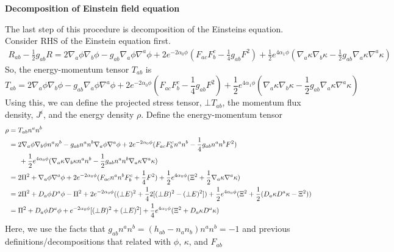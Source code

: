 \documentclass[prd]{revtex4}
\begin{document}
\textbf{Decomposition of Einstein field equation}


The last step of this procedure is decomposition of the Einstein\textsc{}s equation. Consider RHS of the Einstein equation first.
\begin{align}
R_{ab} -\frac{1}{2} g_{ab} R = 2 \nabla_a \phi \nabla_b \phi - g_{ab} \nabla_a \phi \nabla^a \phi + 2 e^{-2 \alpha_0 \phi} ( F_{ac} F_b^c -\frac{1}{4} g_{ab} F^2) + \frac{1}{2} e^{4 \alpha_1 \phi} (\nabla_a \kappa \nabla_b \kappa -\frac{1}{2} g_{ab} \nabla_a \kappa \nabla^a \kappa) 
\end{align}
So, the energy-momentum tensor $T_{ab}$ is
\begin{equation}
T_{ab} = 2 \nabla_a \phi \nabla_b \phi - g_{ab} \nabla_a \phi \nabla^a \phi + 2 e^{-2 \alpha_0 \phi} ( F_{ac} F_b^c -\frac{1}{4} g_{ab} F^2) +\frac{1}{2} e^{4 \alpha_1 \phi} (\nabla_a \kappa \nabla_b \kappa -\frac{1}{2} g_{ab} \nabla_a \kappa \nabla^a \kappa)
\end{equation}
Using this, we can define the projected stress tensor, $\bot T_{ab}$, the momentum flux density, $J^i$, and the energy density $\rho$. Define the energy-momentum tensor
\begin{align}
\rho &= T_{ab} n^a n^b \nonumber \\
       &= 2 \nabla_a \phi \nabla_b \phi n^a n^b - g_{ab} n^a n^b \nabla_a \phi \nabla^a \phi + 2 e^{-2 \alpha_0 \phi} ( F_{ac} F_b^c n^a n^b -\frac{1}{4} g_{ab} n^a n^b F^2) \nonumber \\
       &\indent +\frac{1}{2} e^{4 \alpha_0 \phi} (\nabla_a \kappa \nabla_b \kappa n^a n^b -\frac{1}{2} g_{ab} n^a n^b \nabla_a \kappa \nabla^a \kappa) \nonumber \\
       & = 2 \Pi^2 + \nabla_a \phi \nabla^a \phi + 2 e^{-2 \alpha_0 \phi} ( F_{ac} n^a n^b F_b^c  + \frac{1}{4} F^2) +\frac{1}{2} e^{4 \alpha_0 \phi} (\Xi^2 + \frac{1}{2} \nabla_a \kappa \nabla^a \kappa) \nonumber \\
       &= 2 \Pi^2 + D_a \phi D^a \phi - \Pi^2  + 2 e^{-2 \alpha_0 \phi} ((\bot E)^2 + \frac{1}{4} 2[(\bot B)^2 - (\bot E)^2] ) +\frac{1}{2} e^{4 \alpha_0 \phi} (\Xi^2 + \frac{1}{2} ( D_a \kappa D^a \kappa - \Xi^2)) \nonumber \\
       &= \Pi^2 + D_a \phi D^a \phi + e^{-2 \alpha_0 \phi} [(\bot B)^2 + (\bot E)^2]  +\frac{1}{4} e^{4 \alpha_1 \phi} (\Xi^2 +  D_a \kappa D^a \kappa) 
\end{align}
Here, we use the facts that $g_{ab} n^a n^b = (h_{ab} - n_a n_b) n^a n^b = -1$ and previous definitions/decompositions that related with $\phi$, $\kappa$, and $F_{ab}$
\end{document}
